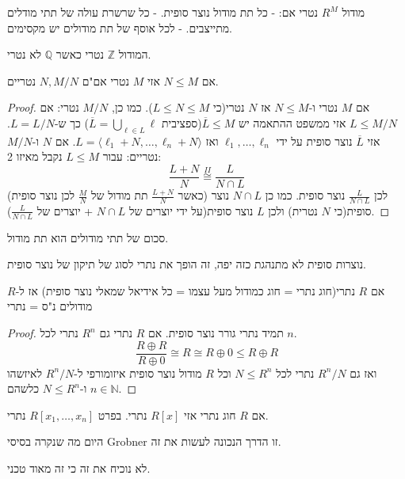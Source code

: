 \documentclass{tstextbook}
\begin{document}
\begin{reminder}
מודול \(R^{M}\) נטרי אם:
- כל תת מודול נוצר סופית.
- כל שרשרת עולה של תתי מודלים מתייצבים.
- לכל אוסף של תת מודולים יש מקסימים.

\end{reminder}
\begin{example}
המודול \(\mathbb{Z}\) נטרי כאשר \(\mathbb{Q}\) לא נטרי.

\end{example}
\begin{proposition}
אם \(N\leq M\) אזי \(M\) נטרי אם"ם \(N,M / N\) נטריים.

\end{proposition}
\begin{proof}
אם \(M\) נטרי ו-\(N\leq M\) אז \(N\) נטרי(כי \(L\leq N \leq M\)). כמו כן, \(M / N\) נטרי:
אם \(L\leq M / N\) אזי ממשפט ההתאמה יש \(\overline{L}\leq M\)(ספציבית \(\overline{L}=\bigcup_{\ell \in L}\ell\)) כך ש-\(L = L / N\). אזי \(\overline{L}\) נוצר סופית על ידי \(\ell_{1},\dots,\ell_{n}\) ואז \(L=\langle \ell_{1}+N, \dots,\ell_{n}+N \rangle\).
אם \(N\) ו-\(M / N\) נטריים:
עבור \(L\leq M\) נקבל מאיזו 2:
$$\frac{L+N}{N}\overset{II}{\cong } \frac{L}{N\cap  L}$$
(כאשר \(\frac{L+N}{N}\) תת מודול של \(\frac{M}{ N}\) לכן נוצר סופית) לכן \(\frac{L}{N \cap L}\) נוצר סופית. כמו כן \(N\cap L\) נוצר סופית(כי \(N\) נטרית) ולכן \(L\) נוצר סופית(על ידי יוצרים של \(N\cap L\) + יוצרים של \(\frac{L}{N\cap L}\)).

\end{proof}
\begin{remark}
סכום של תתי מודולים הוא תת מודול.

\end{remark}
\begin{remark}
נוצרות סופית לא מתנהגת כזה יפה, זה הופך את נתרי לסוג של תיקון של נוצר סופית.

\end{remark}
\begin{corollary}
אם \(R\) נתרי(חוג נתרי = חוג כמודול מעל עצמו = כל אידיאל שמאלי נוצר סופית) אז ל-\(R\) מודולים נ"ס = נתרי

\end{corollary}
\begin{proof}
תמיד נתרי גורר נוצר סופית. אם \(R\) נתרי גם \(R^{n}\) נתרי לכל \(n\).
$$\frac{R\oplus R}{R\oplus 0}\cong R\cong R\oplus 0 \leq  R\oplus R$$
ואז גם \(R^{n} / N\) נתרי לכל \(N\leq R^{n}\) וכל \(R\) מודול נוצר סופית איזומורפי ל-\(R^{n} / N\) לאיזשהו \(n \in \mathbb{N}\) ו-\(N\leq R^{n}\) כלשהם.

\end{proof}
\begin{proposition}
אם \(R\) חוג נתרי אזי \(R[x]\) נתרי. בפרט \(R[x_{1},\dots,x_{n}]\) נתרי.

\end{proposition}
\begin{remark}
היום מה שנקרה בסיסי Grobner זו הדרך הנכונה לעשות את זה.

\end{remark}
לא נוכיח את זה כי זה מאוד טכני.
\end{document}
